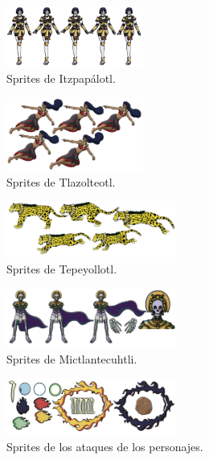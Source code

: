 \begin{figure}[H]
    \centering
    \includegraphics[width=0.40\textwidth]{Anexos/disenios/Itzpapalotl.png}
    \caption{Sprites de Itzpapálotl.}
    \label{fig:Itzpapalotl}
\end{figure}

\begin{figure}[H]
    \centering
    \includegraphics[width=0.40\textwidth]{Anexos/disenios/Tlazolteotl.png}
    \caption{Sprites de Tlazolteotl.}
    \label{fig:Tlazolteotl}
\end{figure}

\begin{figure}[H]
    \centering
    \includegraphics[width=0.50\textwidth]{Anexos/disenios/Tepeyollotl.png}
    \caption{Sprites de Tepeyollotl.}
    \label{fig:Tepeyollotl}
\end{figure}

\begin{figure}[H]
    \centering
    \includegraphics[width=0.50\textwidth]{Anexos/disenios/Mictlantecuhtli.png}
    \caption{Sprites de Mictlantecuhtli.}
    \label{fig:Mictlantecuhtli}
\end{figure}

\begin{figure}[H]
    \centering
    \includegraphics[width=0.50\textwidth]{Anexos/disenios/Ataques.png}
    \caption{Sprites de los ataques de los personajes.}
    \label{fig:Attack}
\end{figure}

